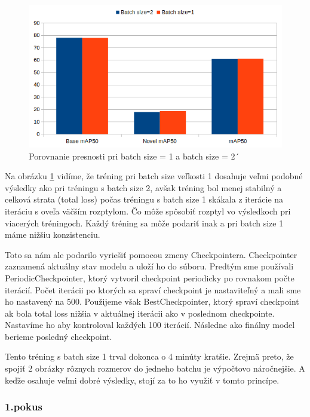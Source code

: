 \begin{figure}[H]
\centering
\includegraphics[width=\textwidth]{images/batch_size_comparison.png}
\caption{Porovnanie presnosti pri batch size = 1 a batch size = 2´}
\label{fig:image9}
\end{figure}

Na obrázku \ref{fig:image9} vidíme, že tréning pri batch size veľkosti 1 dosahuje veľmi podobné výsledky ako pri tréningu s batch size 2, avšak tréning bol menej stabilný a celková strata (total loss) počas tréningu s batch size 1 skákala z iterácie na iteráciu s oveľa väčším rozptylom. Čo môže spôsobiť rozptyl vo výsledkoch pri viacerých tréningoch. Každý tréning sa môže podariť inak a pri batch size 1 máme nižšiu konzistenciu. 

Toto sa nám ale podarilo vyriešiť pomocou zmeny Checkpointera. Checkpointer zaznamená aktuálny stav modelu a uloží ho do súboru. Predtým sme používali PeriodicCheckpointer, ktorý vytvoril checkpoint periodicky po rovnakom počte iterácií. Počet iterácii po ktorých sa spraví checkpoint je nastaviteľný a mali sme ho nastavený na 500. Použijeme však BestCheckpointer, ktorý spraví checkpoint ak bola total loss nižšia v aktuálnej iterácii ako v poslednom checkpointe. Nastavíme ho aby kontroloval každých 100 iterácií. Následne ako finálny model berieme posledný checkpoint. 

Tento tréning s batch size 1 trval dokonca o 4 minúty kratšie. Zrejmä preto, že spojiť 2 obrázky rôznych rozmerov do jedneho batchu je výpočtovo náročnejšie. A keďže osahuje veľmi dobré výsledky, stojí za to ho využiť v tomto princípe. 

\subsubsection{1.pokus}

